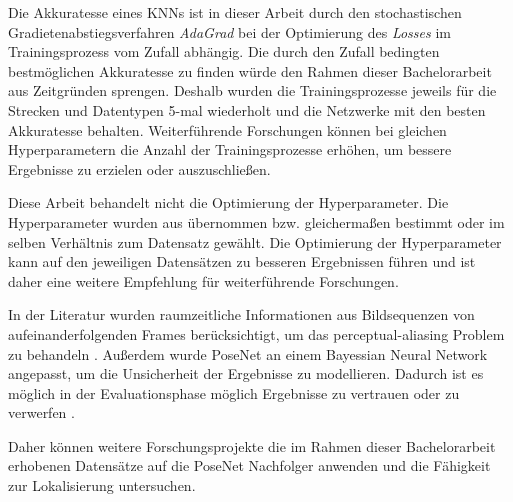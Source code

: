 Die Akkuratesse eines KNNs ist in dieser Arbeit durch den stochastischen Gradietenabstiegsverfahren \textit{AdaGrad} bei der Optimierung des \textit{Losses} im Trainingsprozess vom Zufall abhängig. Die durch den Zufall bedingten bestmöglichen Akkuratesse zu finden würde den Rahmen dieser Bachelorarbeit aus Zeitgründen sprengen. Deshalb wurden die Trainingsprozesse jeweils für die Strecken und Datentypen 5-mal wiederholt und die Netzwerke mit den besten Akkuratesse behalten. Weiterführende Forschungen können bei gleichen Hyperparametern die Anzahl der Trainingsprozesse erhöhen, um bessere Ergebnisse zu erzielen oder auszuschließen. 


Diese Arbeit behandelt nicht die Optimierung der Hyperparameter. Die Hyperparameter wurden aus \citet{acharyaBIMPoseNetIndoorCamera2019} übernommen bzw. gleichermaßen bestimmt oder im selben Verhältnis zum Datensatz gewählt. Die Optimierung der Hyperparameter kann auf den jeweiligen Datensätzen zu besseren Ergebnissen führen und ist daher eine weitere Empfehlung für weiterführende Forschungen. 

In der Literatur wurden raumzeitliche Informationen aus Bildsequenzen von aufeinanderfolgenden Frames berücksichtigt, um das perceptual-aliasing Problem zu behandeln \cite{walchImageBasedLocalizationUsing2017, clarkVidLocDeepSpatioTemporal2017}. Außerdem wurde PoseNet an einem Bayessian Neural Network angepasst, um die Unsicherheit der Ergebnisse zu modellieren. Dadurch ist es möglich in der Evaluationsphase möglich Ergebnisse zu vertrauen oder zu verwerfen \cite{kendallModellingUncertaintyDeep2016}. 


Daher können weitere Forschungsprojekte die im Rahmen dieser Bachelorarbeit erhobenen Datensätze auf die PoseNet Nachfolger \cite{kendallModellingUncertaintyDeep2016, walchImageBasedLocalizationUsing2017, clarkVidLocDeepSpatioTemporal2017} anwenden und die Fähigkeit zur Lokalisierung untersuchen.